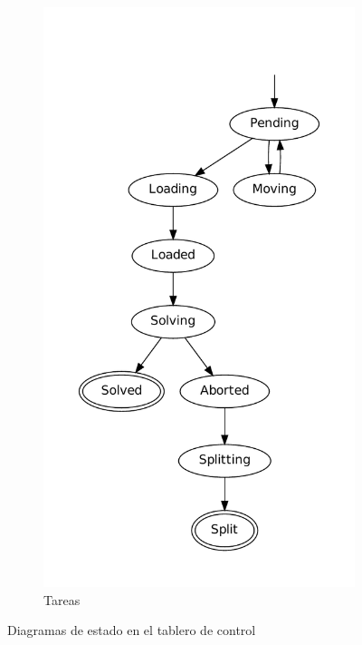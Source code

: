 \begin{figure}
\begin{subfigure}{0.27\textwidth}
		\includegraphics[scale=0.3]{graphs/taskstates}
		\caption{Tareas}
	\end{subfigure}
	\caption{Diagramas de estado en el tablero de control}
	\label{fig:states}
	\vspace{-1em}
\end{figure}

